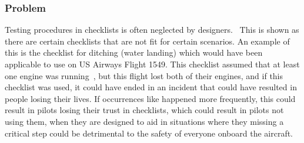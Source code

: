 \documentclass[a4paper]{article}
\newcommand{\lfcomment}[1]{\textcolor{blue}{\textbf{LF}:~#1}}
\renewcommand{\lfcomment}[1]{\relax}
\begin{document}
\subsubsection*{Problem}

Testing procedures in checklists is often neglected by designers.~\cite{nasa-design}
This is shown as there are certain checklists that are not fit for 
certain scenarios. An example of this is the checklist for ditching (water landing)
which would have been applicable to use on US Airways Flight 1549. This checklist 
assumed that at least one engine was running~\cite{AWE1549}, but this flight lost 
both of their engines, and if this checklist was used, it could have ended in 
an incident that could have resulted in people losing their lives.
If occurrences like happened more frequently, this could result in 
pilots losing their trust in checklists, which could result in pilots 
not using them, when they are designed to aid in situations where
they missing a critical step could be detrimental to the safety of 
everyone onboard the aircraft.~\cite{manifesto}
\end{document}
